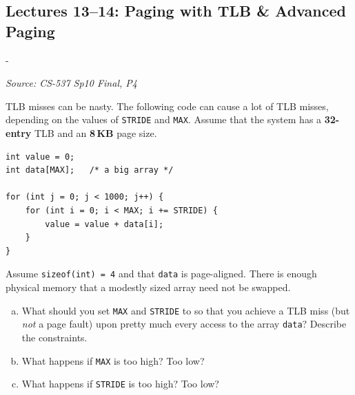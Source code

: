 \documentclass[11pt,a4paper]{article}
\makeatletter
\newcommand{\keepspace}[1]{\par\penalty-100\begingroup
  \setlength{\dimen@}{#1}\dimen@ii\pagegoal\advance\dimen@ii-\pagetotal
  \ifdim\dimen@>\dimen@ii\ifdim\dimen@ii>\z@\vfil\fi\break\fi\endgroup}
\newcounter{qn}[section]
\newenvironment{Qn}[4]{%
  \refstepcounter{qn}\keepspace{7\baselineskip}%
  \begin{tcolorbox}[qboxstyle, title={Q\thesection.\theqn\ \ [#1 \textbar\ #2]\ \ #4}]%
  {\footnotesize\color{g3}\textit{Source: #3}}\par\smallskip%
}{%
  \end{tcolorbox}%
}
\makeatother
\begin{document}
\subsection{Lectures 13--14: Paging with TLB \& Advanced Paging}

\begin{Qn}{Hard}{Lect 13}{CS-537 Sp10 Final, P4}{Forcing a TLB miss on (almost) every access}
TLB misses can be nasty. The following code can cause a lot of TLB misses,
depending on the values of \texttt{STRIDE} and \texttt{MAX}. Assume that the
system has a \textbf{32-entry} TLB and an \textbf{8\,KB} page size.
\begin{lstlisting}[numbers=none]
int value = 0;
int data[MAX];   /* a big array */

for (int j = 0; j < 1000; j++) {
    for (int i = 0; i < MAX; i += STRIDE) {
        value = value + data[i];
    }
}
\end{lstlisting}
Assume \texttt{sizeof(int) = 4} and that \texttt{data} is page-aligned.
There is enough physical memory that a modestly sized array need not be
swapped.
\begin{enumerate}[(a)]
\item What should you set \texttt{MAX} and \texttt{STRIDE} to so that you
      achieve a TLB miss (but \emph{not} a page fault) upon pretty much
      every access to the array \texttt{data}? Describe the constraints.
\item What happens if \texttt{MAX} is too high? Too low?
\item What happens if \texttt{STRIDE} is too high? Too low?
\end{enumerate}
\end{Qn}
\end{document}
